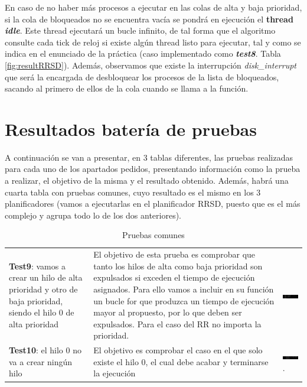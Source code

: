 \documentclass[10pt, spanish, pdftex]{template/UC3M_document}
\begin{document}
En caso de no haber más procesos a ejecutar en las colas de alta y baja prioridad, si la cola de bloqueados no se encuentra vacía se pondrá en ejecución el \textbf{thread \textit{idle}}. Este thread ejecutará un bucle infinito, de tal forma que el algoritmo consulte cada tick de reloj si existe algún thread listo para ejecutar, tal y como se indica en el enunciado de la práctica (caso implementado como \textbf{\textit{test8}}. Tabla \ref{fig:resultRRSD}). 
Además, observamos que existe la interrupción \textit{disk\_interrupt} que será la encargada de desbloquear los procesos de la lista de bloqueados, sacando al primero de ellos de la cola cuando se llama a la función.

\newpage
\section{Resultados batería de pruebas}
A continuación se van a presentar, en 3 tablas diferentes, las pruebas realizadas para cada uno de los apartados pedidos, presentando información como la prueba a realizar, el objetivo de la misma y el resultado obtenido. Además, habrá una cuarta tabla con pruebas comunes, cuyo resultado es el mismo en los 3 planificadores (vamos a ejecutarlas en el planificador RRSD, puesto que es el más complejo y agrupa todo lo de los dos anteriores).

\begin{table}[h!]
    \centering
    \begin{tabular}{|C{0.2\textwidth}|C{0.35\textwidth}|C{0.35\textwidth}|}
    \hline
     &  &  \\ \hline
    \textbf{Test9}: vamos a crear un hilo de alta prioridad y otro de baja prioridad, siendo el hilo 0 de alta prioridad & El objetivo de esta prueba es comprobar que tanto los hilos de alta como baja prioridad son expulsados si exceden el tiempo de ejecución asignados. Para ello vamos a incluir en su función un bucle for que produzca un tiempo de ejecución mayor al propuesto, por lo que deben ser expulsados. Para el caso del RR no importa la prioridad. & \includegraphics[width=5cm]{arboles/test9.png}
    \\ \hline
    \textbf{Test10}: el hilo 0 no va a crear ningún hilo & El objetivo es comprobar el caso en el que solo existe el hilo 0, el cual debe acabar y terminarse la ejecución & \includegraphics[width=5cm]{arboles/test10.png}. \\\hline
    \end{tabular}
    \caption{Pruebas comunes}
    \label{fig:result}
\end{table}
\end{document}
